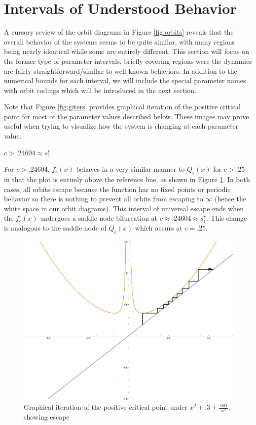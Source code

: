 \section{Intervals of Understood Behavior} \label{res:understood}

	A cursory review of the orbit diagrams in Figure \ref{fig:orbits} reveals that the overall behavior of the systems seems to be quite similar, with many regions being nearly identical while some are entirely different. This section will focus on the former type of parameter intervals, briefly covering regions were the dynamics are fairly straightforward/similar to well known behaviors. In addition to the numerical bounds for each interval, we will include the special parameter names with orbit codings which will be introduced in the next section.

	Note that Figure \ref{fig:giters} provides graphical iteration of the positive critical point for most of the parameter values described below. These images may prove useful when trying to visualize how the system is changing at each parameter value.

	\underline{$c > .24604 \approx s_1^r$}

	For $c > .24604$, $f_c (x)$ behaves in a very similar manner to $Q_c (x)$ for $c > .25$ in that the plot is entirely above the reference line, as shown in Figure \ref{esc}. In both cases, all orbits escape because the function has no fixed points or periodic behavior so there is nothing to prevent all orbits from escaping to $\infty$ (hence the white space in our orbit diagrams). This interval of universal escape ends when the $f_c (x)$ undergoes a saddle node bifurcation at $c \approx .24604 \approx s_1^r$. This change is analogous to the saddle node of $Q_c (x)$ which occurs at $c = .25$. 

	\begin{figure}
		\centering
		\includegraphics[width=.75\textwidth]{./img/plot03}
		\caption{Graphical iteration of the positive critical point under $x^2 + .3 + \frac{.001}{x^2}$, showing escape}
		\label{esc}
	\end{figure}

